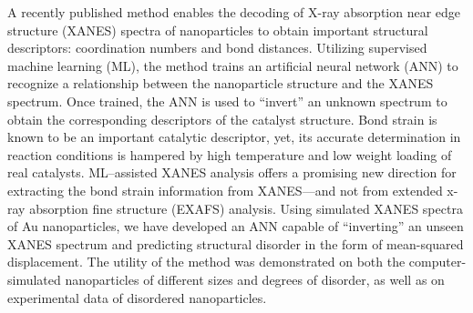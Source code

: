 


A recently published method \cite{Timoshenko2017} enables the decoding of X-ray absorption near edge structure (XANES) spectra of nanoparticles to obtain important structural descriptors: coordination numbers and bond distances. Utilizing supervised machine learning (ML), the method trains an artificial neural network (ANN) to recognize a relationship between the nanoparticle structure and the XANES spectrum. Once trained, the ANN is used to ``invert'' an unknown spectrum to obtain the corresponding descriptors of the catalyst structure. Bond strain is known to be an important catalytic descriptor, yet, its accurate determination in reaction conditions is hampered by high temperature and low weight loading of real catalysts. ML–assisted XANES analysis offers a promising new direction for extracting the bond strain information from XANES---and not from extended x-ray absorption fine structure (EXAFS) analysis. Using simulated XANES spectra of Au nanoparticles, we have developed an ANN capable of ``inverting'' an unseen XANES spectrum and predicting structural disorder in the form of mean-squared displacement. The utility of the method was demonstrated on both the computer-simulated nanoparticles of different sizes and degrees of disorder, as well as on experimental data of disordered nanoparticles.


